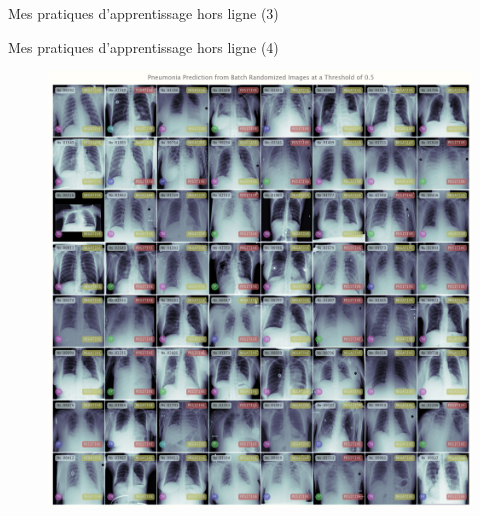 \documentclass{beamer}
\begin{document}
\begin{frame}[fragile]{Mes pratiques d'apprentissage hors ligne (3)}
\begin{figure}[!htb]
			\endminipage\hfill
			\endminipage
		\end{figure}
	\end{frame}
	
	\begin{frame}[fragile]{Mes pratiques d'apprentissage hors ligne (4)}
		\begin{figure}[!htb]
			\vspace{-.25em}
			\centering\includegraphics[width=\linewidth]{images/deep_learning_5_1_1.png}
			\endminipage\hfill

\end{figure}
\end{frame}
\end{document}

